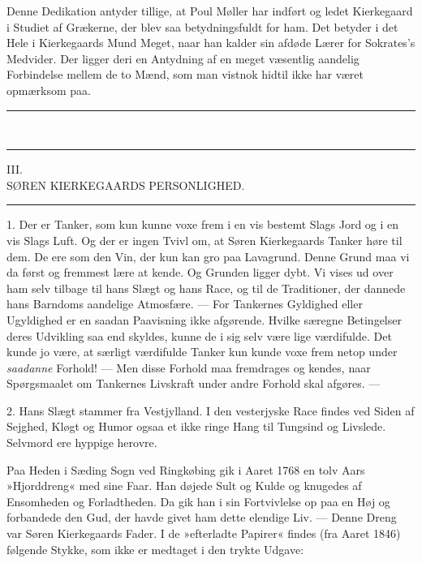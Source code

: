 \documentclass[12pt,a4paper,openany]{book}
\newcommand{\opage}[1]{\marginnote{\footnotesize\textit{[#1]}}}
\begin{document}
Denne Dedikation antyder tillige, at Poul Møller har
indført og ledet Kierkegaard i Studiet af Grækerne, der
\opage{27}blev saa betydningsfuldt for ham. Det betyder i det
Hele i Kierkegaards Mund Meget, naar han kalder sin
afdøde Lærer for Sokrates's Medvider. Der ligger deri
en Antydning af en meget væsentlig aandelig Forbindelse
mellem de to Mænd, som man vistnok hidtil ikke har
været opmærksom paa.
\begin{center}\rule{2cm}{0.4pt}\\[-8pt]\rule{2cm}{0.4pt}\end{center}

\opage{28}\begin{center}III.\\[4pt] SØREN KIERKEGAARDS PERSONLIGHED.\\[4pt]\rule{1.5cm}{0.4pt}\end{center}

1. Der er Tanker, som kun kunne voxe frem i en
vis bestemt Slags Jord og i en vis Slags Luft. Og der
er ingen Tvivl om, at Søren Kierkegaards Tanker høre
til dem. De ere som den Vin, der kun kan gro paa
Lavagrund. Denne Grund maa vi da først og fremmest
lære at kende. Og Grunden ligger dybt. Vi vises ud
over ham selv tilbage til hans Slægt og hans Race, og
til de Traditioner, der dannede hans Barndoms aandelige
Atmosfære. --- For Tankernes Gyldighed eller Ugyldighed
er en saadan Paavisning ikke afgørende. Hvilke
særegne Betingelser deres Udvikling saa end skyldes,
kunne de i sig selv være lige værdifulde. Det kunde jo
være, at særligt værdifulde Tanker kun kunde voxe frem
netop under \textit{saadanne} Forhold! --- Men disse Forhold
maa fremdrages og kendes, naar Spørgsmaalet om Tankernes
Livskraft under andre Forhold skal afgøres. ---

2. Hans Slægt stammer fra Vestjylland. I den
vesterjyske Race findes ved Siden af Sejghed, Kløgt og
Humor ogsaa et ikke ringe Hang til Tungsind og Livslede.
Selvmord ere hyppige herovre.

Paa Heden i Sæding Sogn ved Ringkøbing gik i
Aaret 1768 en tolv Aars »Hjorddreng« med sine Faar.
\opage{29}Han døjede Sult og Kulde og knugedes af Ensomheden
og Forladtheden. Da gik han i sin Fortvivlelse op paa
en Høj og forbandede den Gud, der havde givet ham dette
elendige Liv. --- Denne Dreng var Søren Kierkegaards
Fader. I de »efterladte Papirer« findes (fra Aaret
1846) følgende Stykke, som ikke er medtaget i den trykte
Udgave:
\end{document}

